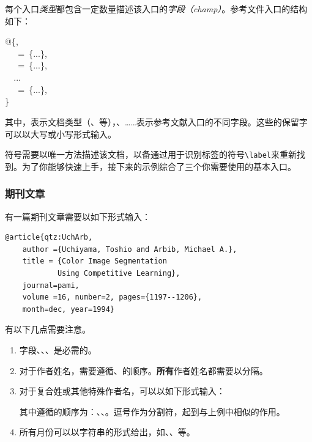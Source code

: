每个入口\emph{类型}都包含一定数量描述该入口的\emph{字段（champ）}。参考文件入口的结构如下：

\begin{dmd}
@\{,\\
\verb|  |\ =\ \{...\},\\
\verb|  |\ =\ \{...\},\\
\verb|  |...\\
\verb|  |\ =\ \{...\},\\
\}
\end{dmd}

其中，表示文档类型（、等），、……表示参考文献入口的不同字段。这些\bib 的保留字可以以大写或小写形式输入。

符号需要以唯一方法描述该文档，以备通过用于识别标签的符号\verb|\label|来重新找到。为了你能够快速上手\bib ，接下来的示例综合了三个你需要使用的基本入口。

\subsubsection{期刊文章}

有一篇期刊文章需要以如下形式输入：

\begin{dmd}
\begin{verbatim}
@article{qtz:UchArb,
    author ={Uchiyama, Toshio and Arbib, Michael A.},
    title = {Color Image Segmentation
            Using Competitive Learning},
    journal=pami,
    volume =16, number=2, pages={1197--1206},
    month=dec, year=1994}\end{verbatim}
\end{dmd}

有以下几点需要注意。

\begin{enumerate}
    \item 字段、、、是必需的。
    \item 对于作者姓名，需要遵循、的顺序。\textbf{所有}作者姓名都需要以分隔。
    \item 对于复合姓或其他特殊作者名，可以以如下形式输入：
    \begin{center}
    \end{center}
    其中遵循的顺序为：、、。逗号作为分割符，起到与上例中相似的作用。
    \item 所有月份可以以字符串的形式给出，如、、等。
\end{enumerate}


